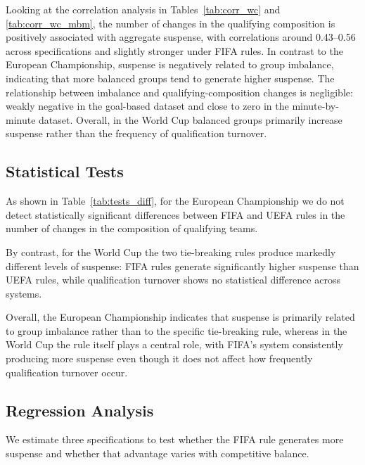 \documentclass[11pt]{article}
\begin{document}



Looking at the correlation analysis in Tables~\ref{tab:corr_wc} and \ref{tab:corr_wc_mbm}, the number of changes in the qualifying composition is positively associated with aggregate suspense, with correlations around 0.43–0.56 across specifications and slightly stronger under FIFA rules. In contrast to the European Championship, suspense is negatively related to group imbalance, indicating that more balanced groups tend to generate higher suspense. The relationship between imbalance and qualifying-composition changes is negligible: weakly negative in the goal-based dataset and close to zero in the minute-by-minute dataset. Overall, in the World Cup balanced groups primarily increase suspense rather than the frequency of qualification turnover.



\subsection{Statistical Tests}

As shown in Table~\ref{tab:tests_diff}, for the European Championship we do not detect statistically significant differences between FIFA and UEFA rules in the number of changes in the composition of qualifying teams. 

By contrast, for the World Cup the two tie-breaking rules produce markedly different levels of suspense: FIFA rules generate significantly higher suspense than UEFA rules, while qualification turnover shows no statistical difference across systems.

Overall, the European Championship indicates that suspense is primarily related to group imbalance rather than to the specific tie-breaking rule, whereas in the World Cup the rule itself plays a central role, with FIFA’s system consistently producing more suspense even though it does not affect how frequently qualification turnover occur.



\subsection{Regression Analysis}

We estimate three specifications to test whether the FIFA rule generates more suspense and whether that advantage varies with competitive balance.
\end{document}
